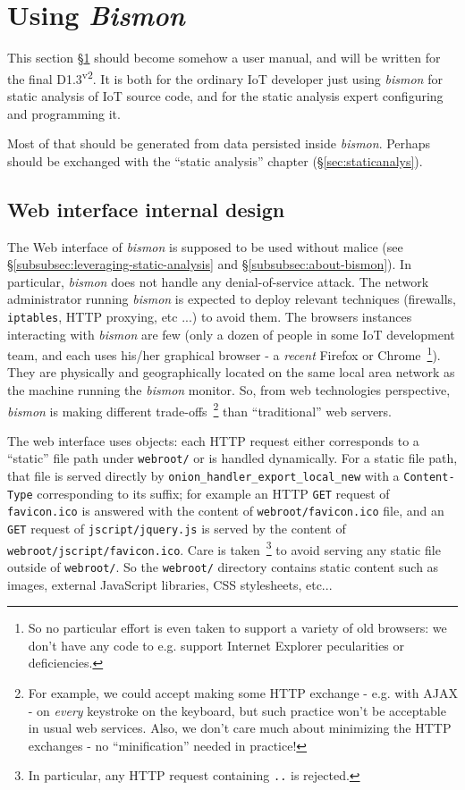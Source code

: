 \section{Using \emph{Bismon}}
\label{sec:using}

This section §\ref{sec:using} should become somehow a user manual, and
will be written for the final D1.3\textsuperscript{v2}. It is both for
the ordinary IoT developer just using \emph{bismon} for static
analysis of IoT source code, and for the static analysis expert
configuring and programming it.

Most of that should be generated from data persisted inside \emph{bismon}. Perhaps
should be exchanged with the ``static analysis'' chapter
(§\ref{sec:staticanalys}).


\subsection{Web interface internal design}
\label{subsec:webinterf}

The Web interface of \emph{bismon} is supposed to be used without
malice (see §\ref{subsubsec:leveraging-static-analysis} and
§\ref{subsubsec:about-bismon}). In particular, \emph{bismon} does not
handle any denial-of-service attack. The network administrator running
\emph{bismon} is expected to deploy relevant techniques (firewalls,
\texttt{iptables}, HTTP proxying, etc ...) to avoid them. The browsers
instances interacting with \emph{bismon} are few (only a dozen of
people in some IoT development team, and each uses his/her graphical
browser - a \emph{recent} Firefox or Chrome~\footnote{So no particular
  effort is even taken to support a variety of old browsers: we don't
  have any code to e.g. support Internet Explorer pecularities or
  deficiencies.}). They are physically and geographically located on
the same local area network as the machine running the \emph{bismon}
monitor. So, from web technologies perspective, \emph{bismon} is
making different trade-offs~\footnote{For example, we could accept
  making some HTTP exchange - e.g. with AJAX - on \emph{every}
  keystroke on the keyboard, but such practice won't be acceptable in
  usual web services. Also, we don't care much about minimizing the
  HTTP exchanges - no ``minification'' needed in practice!} than
``traditional'' web servers.

The web interface uses objects: each HTTP request either corresponds
to a ``static'' file path under \texttt{webroot/} or is handled
dynamically. For a static file path, that file is served directly by
\texttt{onion\_handler\_export\_local\_new} with a
\texttt{Content-Type} corresponding to its suffix; for example an HTTP
\texttt{GET} request of \texttt{favicon.ico} is answered with the
content of \texttt{webroot/favicon.ico} file, and an \texttt{GET}
request of \texttt{jscript/jquery.js} is served by the content of
\texttt{webroot/jscript/favicon.ico}. Care is taken~\footnote{In
  particular, any HTTP request containing \texttt{..} is rejected.} to
avoid serving any static file outside of \texttt{webroot/}. So the
\texttt{webroot/} directory contains static content such as images,
external JavaScript libraries, CSS stylesheets, etc...


